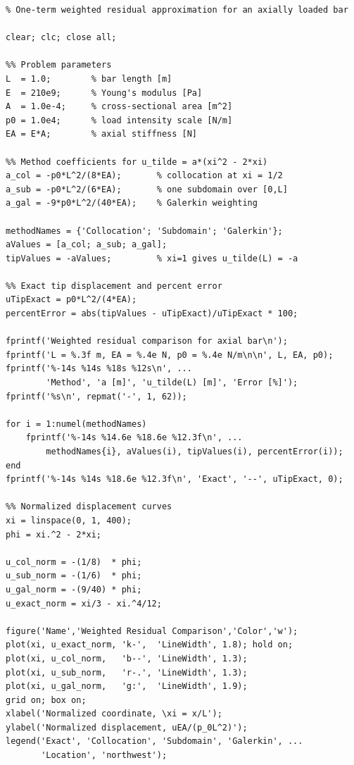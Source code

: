 \begin{lstlisting}[caption={MATLAB comparison of weighted residual methods},
                   label={lst:wr_matlab_comparison}]
% weighted_residual_comparison.m
% One-term weighted residual approximation for an axially loaded bar

clear; clc; close all;

%% Problem parameters
L  = 1.0;        % bar length [m]
E  = 210e9;      % Young's modulus [Pa]
A  = 1.0e-4;     % cross-sectional area [m^2]
p0 = 1.0e4;      % load intensity scale [N/m]
EA = E*A;        % axial stiffness [N]

%% Method coefficients for u_tilde = a*(xi^2 - 2*xi)
a_col = -p0*L^2/(8*EA);       % collocation at xi = 1/2
a_sub = -p0*L^2/(6*EA);       % one subdomain over [0,L]
a_gal = -9*p0*L^2/(40*EA);    % Galerkin weighting

methodNames = {'Collocation'; 'Subdomain'; 'Galerkin'};
aValues = [a_col; a_sub; a_gal];
tipValues = -aValues;         % xi=1 gives u_tilde(L) = -a

%% Exact tip displacement and percent error
uTipExact = p0*L^2/(4*EA);
percentError = abs(tipValues - uTipExact)/uTipExact * 100;

fprintf('Weighted residual comparison for axial bar\n');
fprintf('L = %.3f m, EA = %.4e N, p0 = %.4e N/m\n\n', L, EA, p0);
fprintf('%-14s %14s %18s %12s\n', ...
        'Method', 'a [m]', 'u_tilde(L) [m]', 'Error [%]');
fprintf('%s\n', repmat('-', 1, 62));

for i = 1:numel(methodNames)
    fprintf('%-14s %14.6e %18.6e %12.3f\n', ...
        methodNames{i}, aValues(i), tipValues(i), percentError(i));
end
fprintf('%-14s %14s %18.6e %12.3f\n', 'Exact', '--', uTipExact, 0);

%% Normalized displacement curves
xi = linspace(0, 1, 400);
phi = xi.^2 - 2*xi;

u_col_norm = -(1/8)  * phi;
u_sub_norm = -(1/6)  * phi;
u_gal_norm = -(9/40) * phi;
u_exact_norm = xi/3 - xi.^4/12;

figure('Name','Weighted Residual Comparison','Color','w');
plot(xi, u_exact_norm, 'k-',  'LineWidth', 1.8); hold on;
plot(xi, u_col_norm,   'b--', 'LineWidth', 1.3);
plot(xi, u_sub_norm,   'r-.', 'LineWidth', 1.3);
plot(xi, u_gal_norm,   'g:',  'LineWidth', 1.9);
grid on; box on;
xlabel('Normalized coordinate, \xi = x/L');
ylabel('Normalized displacement, uEA/(p_0L^2)');
legend('Exact', 'Collocation', 'Subdomain', 'Galerkin', ...
       'Location', 'northwest');
\end{lstlisting}

